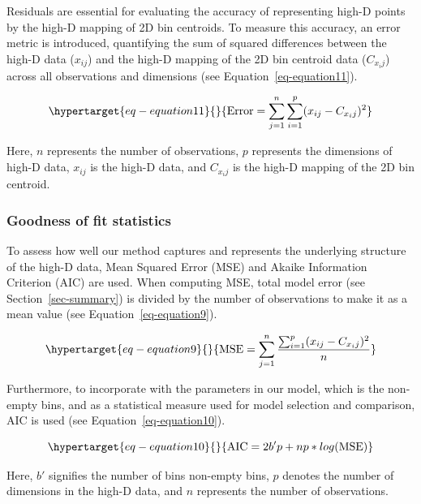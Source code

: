 \documentclass[
  12pt]{article}
\begin{document}
Residuals are essential for evaluating the accuracy of representing
high-D points by the high-D mapping of 2D bin centroids. To measure this
accuracy, an error metric is introduced, quantifying the sum of squared
differences between the high-D data (\(x_{ij}\)) and the high-D mapping
of the 2D bin centroid data (\(C_{x_ij}\)) across all observations and
dimensions (see Equation~\ref{eq-equation11}).

\begin{equation}\protect\hypertarget{eq-equation11}{}{
\text{Error} = \sum_{j = 1}^{n}\sum_{i = 1}^{p} (x_{ij} - C_{x_ij})^2
}\label{eq-equation11}\end{equation}

Here, \(n\) represents the number of observations, \(p\) represents the
dimensions of high-D data, \(x_{ij}\) is the high-D data, and
\(C_{x_ij}\) is the high-D mapping of the 2D bin centroid.

\hypertarget{sec-goodfit}{%
\subsubsection{Goodness of fit statistics}\label{sec-goodfit}}

To assess how well our method captures and represents the underlying
structure of the high-D data, Mean Squared Error (MSE) and Akaike
Information Criterion (AIC) are used. When computing MSE, total model
error (see Section~\ref{sec-summary}) is divided by the number of
observations to make it as a mean value (see
Equation~\ref{eq-equation9}).

\begin{equation}\protect\hypertarget{eq-equation9}{}{
\text{MSE} = \sum_{j = 1}^{n} \frac{\sum_{i = 1}^{p} (x_{ij} - C_{x_ij})^2}{n}
}\label{eq-equation9}\end{equation}

Furthermore, to incorporate with the parameters in our model, which is
the non-empty bins, and as a statistical measure used for model
selection and comparison, AIC is used (see
Equation~\ref{eq-equation10}).

\begin{equation}\protect\hypertarget{eq-equation10}{}{
\text{AIC} = 2b'p + np * log(\text{MSE})
}\label{eq-equation10}\end{equation}

Here, \(b'\) signifies the number of bins non-empty bins, \(p\) denotes
the number of dimensions in the high-D data, and \(n\) represents the
number of observations.
\end{document}
